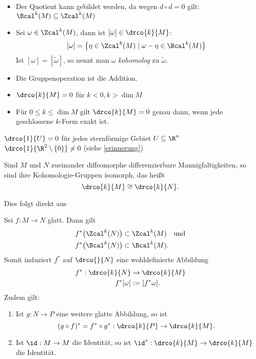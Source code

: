\begin{rem*}
	\begin{itemize}
		\item Der Quotient kann gebildet werden, da wegen $d \circ d = 0$ gilt: $\Bcal^k(M) \subseteq \Zcal^k(M)$
		\item Sei $\omega \in \Zcal^k(M)$, dann ist $[\omega] \in \drco{k}{M}$:
			\[ [\omega] = \big\{ \eta \in \Zcal^k(M) \mid \omega - \eta \in \Bcal^k(M) \big\} \]
			Ist $[\omega] = [\tilde{\omega}]$, so nennt man $\omega$ \emph{kohomolog} zu $\tilde{\omega}$.
		\item Die Gruppenoperation ist die Addition.
		\item $ \drco{k}{M} = 0 $ für $k<0, k > \dim M$
		\item Für $ 0 \leq k \leq \dim M $ gilt $ \drco{k}{M} = 0 $ genau dann, wenn jede geschlossene $k$-Form exakt ist.
	\end{itemize}
\end{rem*}

\begin{exmp*}
	$ \drco{1}{U} = 0 $ für jedes sternförmige Gebiet $U \subseteq \R^n$\\
	$ \drco{1}{\R^2 \setminus \{0\}} \neq 0 $ (siehe \ref{erinnerung})
\end{exmp*}

\begin{lem}\label{7.14}
	Sind $M$ und $N$ zueinander diffeomorphe differenzierbare Mannigfaltigkeiten, so sind ihre Kohomologie-Gruppen isomorph, das heißt
	\[ \drco{k}{M} \cong \drco{k}{N}. \]
\end{lem}

\noindent Dies folgt direkt aus

\begin{lem}
	Sei $ f: M \to N $ glatt. Dann gilt
	\begin{align*}
		f^*\big(\Zcal^k(N)\big) &\subset \Zcal^k(M) \quad \text{und}\\
		f^*\big(\Bcal^k(N)\big) &\subset \Bcal^k(M).
	\end{align*}
	Somit induziert $f^*$ auf $\drco{}{N}$ eine wohldefinierte Abbildung
	\begin{align*}
		f^*: \drco{k}{N} &\to \drco{k}{M}\\
		f^*[\omega] &:= [f^*\omega].
	\end{align*}
	Zudem gilt:
	\begin{enumerate}[label={\roman*})]
		\item Ist $g: N \to P$ eine weitere glatte Abbildung, so ist
			\[ (g \circ f)^* = f^* \circ g^*: \drco{k}{P} \to \drco{k}{M}. \]
		\item Ist $\id: M \to M$ die Identität, so ist $ \id^*: \drco{k}{M} \to \drco{k}{M} $ die Identität.
	\end{enumerate}
\end{lem}

